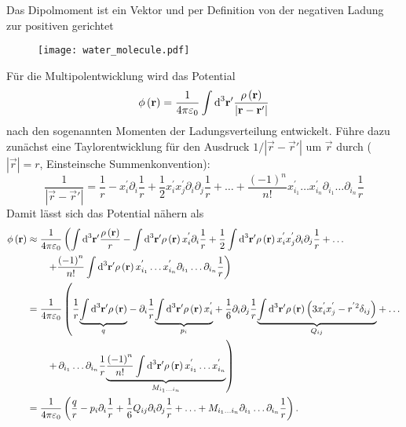 Das Dipolmoment ist ein Vektor und per Definition von der negativen Ladung zur positiven gerichtet



\begin{figure}[htb]
	\centering
	\texttt{[image: water\_molecule.pdf]}
	\caption{}
	\label{fig:water_molecule}
\end{figure}

Für die Multipolentwicklung wird das Potential
\begin{equation*}
	\phi \left(\mathbf{r}\right)=\frac{1}{4\pi \varepsilon _{0}}\int \text{d} ^{3}\mathbf{r}'\frac{\rho \left(\mathbf{r}\right)}{\left| \mathbf{r}-\mathbf{r}'\right| }
\end{equation*}
nach den sogenannten Momenten der Ladungsverteilung entwickelt. Führe dazu zunächst eine Taylorentwicklung für den Ausdruck $1/\left| \vec {r}-\vec {r}'\right| $ um $\vec {r}$ durch ($\left| \vec {r}\right| =r$, Einsteinsche Summenkonvention):
\begin{equation*}
	\frac{1}{\left| \vec {r}-\vec {r}'\right| }=\frac{1}{r}-x_{i}^{'}\partial _{i}\frac{1}{r}+\frac{1}{2}x_{i}^{'}x_{j}^{'}\partial _{i}\partial _{j}\frac{1}{r}+\ldots +\frac{\left(-1\right)^{n}}{n!}x_{i_{1}}^{'}\ldots x_{i_{n}}^{'}\partial _{{i_{1}}}\ldots \partial _{{i_{n}}}\frac{1}{r}
\end{equation*}
Damit lässt sich das Potential nähern als
\begin{align*}
	\phi \left(\mathbf{r}\right)&\approx \frac{1}{4\pi \varepsilon _{0}}\left(\int \text{d} ^{3}\mathbf{r}'\frac{\rho \left(\mathbf{r}\right)}{r}-\int \text{d} ^{3}\mathbf{r}'\rho \left(\mathbf{r}\right)x_{i}^{'}\partial _{i}\frac{1}{r}+\frac{1}{2}\int \text{d} ^{3}\mathbf{r}'\rho \left(\mathbf{r}\right)x_{i}^{'}x_{j}^{'}\partial _{i}\partial _{j}\frac{1}{r}+\ldots \right. \\ &\quad\quad\left. +\frac{\left(-1\right)^{n}}{n!}\int \text{d} ^{3}\mathbf{r}'\rho \left(\mathbf{r}\right)x_{i_{1}}^{'}\ldots  x_{i_{n}}^{'}\partial _{{i_{1}}}\ldots \partial _{{i_{n}}}\frac{1}{r}\right)\\&=\frac{1}{4\pi \varepsilon _{0}}\left(\frac{1}{r}\underset{q}{\underbrace{\int \text{d} ^{3}\mathbf{r}'\rho \left(\mathbf{r}\right)}}-\partial _{i}\frac{1}{r}\underset{p_{i}}{\underbrace{\int \text{d} ^{3}\mathbf{r}'\rho \left(\mathbf{r}\right)x_{i}^{'}}}+\frac{1}{6}\partial _{i}\partial _{j}\frac{1}{r}\underset{Q_{ij}}{\underbrace{\int \text{d} ^{3}\mathbf{r}'\rho \left(\mathbf{r}\right)\left(3x_{i}^{'}x_{j}^{'}-r^{'2}\delta _{ij}\right)}}+\ldots \right. \\ &\quad\quad\left.  +\,\partial _{{i_{1}}}\ldots \partial _{{i_{n}}}\frac{1}{r}\underset{M_{{i_{1}}\ldots {i_{n}}}}{\underbrace{\frac{\left(-1\right)^{n}}{n!}\int \text{d} ^{3}\mathbf{r}'\rho \left(\mathbf{r}\right)x_{i_{1}}^{'}\ldots x_{i_{n}}^{'}}}\right)\\&=\frac{1}{4\pi \varepsilon _{0}}\left(\frac{q}{r}-p_{i}\partial _{i}\frac{1}{r}+\frac{1}{6}Q_{ij}\partial _{i}\partial _{j}\frac{1}{r}+\ldots +M_{{i_{1}}\ldots {i_{n}}}\partial _{{i_{1}}}\ldots \partial _{{i_{n}}}\frac{1}{r}\right).
\end{align*}
